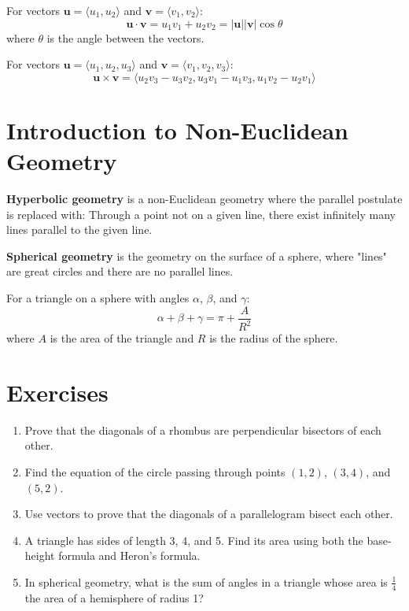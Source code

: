 \begin{definition}
For vectors $\mathbf{u} = \langle u_1, u_2 \rangle$ and $\mathbf{v} = \langle v_1, v_2 \rangle$:
\[\mathbf{u} \cdot \mathbf{v} = u_1 v_1 + u_2 v_2 = |\mathbf{u}||\mathbf{v}|\cos\theta\]
where $\theta$ is the angle between the vectors.
\end{definition}

\begin{definition}
For vectors $\mathbf{u} = \langle u_1, u_2, u_3 \rangle$ and $\mathbf{v} = \langle v_1, v_2, v_3 \rangle$:
\[\mathbf{u} \times \mathbf{v} = \langle u_2 v_3 - u_3 v_2, u_3 v_1 - u_1 v_3, u_1 v_2 - u_2 v_1 \rangle\]
\end{definition}

\section{Introduction to Non-Euclidean Geometry}

\begin{definition}
\textbf{Hyperbolic geometry} is a non-Euclidean geometry where the parallel postulate is replaced with: Through a point not on a given line, there exist infinitely many lines parallel to the given line.
\end{definition}

\begin{definition}
\textbf{Spherical geometry} is the geometry on the surface of a sphere, where "lines" are great circles and there are no parallel lines.
\end{definition}

\begin{theorem}
For a triangle on a sphere with angles $\alpha$, $\beta$, and $\gamma$:
\[\alpha + \beta + \gamma = \pi + \frac{A}{R^2}\]
where $A$ is the area of the triangle and $R$ is the radius of the sphere.
\end{theorem}

\section{Exercises}

\begin{enumerate}
    \item Prove that the diagonals of a rhombus are perpendicular bisectors of each other.
    
    \item Find the equation of the circle passing through points $(1, 2)$, $(3, 4)$, and $(5, 2)$.
    
    \item Use vectors to prove that the diagonals of a parallelogram bisect each other.
    
    \item A triangle has sides of length 3, 4, and 5. Find its area using both the base-height formula and Heron's formula.
    
    \item In spherical geometry, what is the sum of angles in a triangle whose area is $\frac{1}{4}$ the area of a hemisphere of radius 1?
\end{enumerate}
